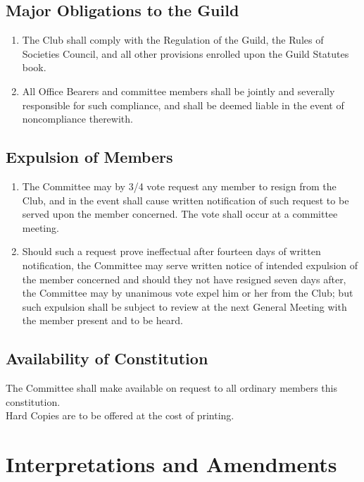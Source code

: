 \documentclass[10pt,a4paper]{report}
\begin{document}
		\section{Major Obligations to the Guild}
			\begin{enumerate}[label=\arabic*]
				\item The Club shall comply with the Regulation of the Guild, the Rules of Societies Council, and all other provisions enrolled upon the Guild Statutes book.
				\item All Office Bearers and committee members shall be jointly and severally responsible for such compliance, and shall be deemed liable in the event of noncompliance therewith.
			\end{enumerate}

		\section{Expulsion of Members}
			\begin{enumerate}[label=\arabic*]
				\item The Committee may by 3/4 vote request any member to resign from the Club, and in the event shall cause written notification of such request to be served upon the member concerned. The vote shall occur at a committee meeting.
				\item Should such a request prove ineffectual after fourteen days of written notification, the Committee may serve written notice of intended expulsion of the member concerned and should they not have resigned seven days after, the Committee may by unanimous vote expel him or her from the Club; but such expulsion shall be subject to review at the next General Meeting with the member present and to be heard.
			\end{enumerate}

		\section{Availability of Constitution}
			The Committee shall make available on request to all ordinary members this constitution. \\
			Hard Copies are to be offered at the cost of printing.

	\chapter{Interpretations and Amendments}
\end{document}
